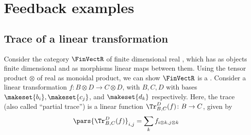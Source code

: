 
\section{Feedback examples}
\publictodomessage

\subsection{Trace of a linear transformation}
\label{subsec:trace-linear}
Consider the category $\FinVectR$ of finite dimensional real , which has as objects finite dimensional  and as morphisms linear maps between them.
Using the tensor product $\otimes$ of real  as monoidal product, we can show $\FinVectR$ is a .
Consider a linear transformation $f\colon B\otimes D\to C\otimes D$, with $B,C,D$  with bases $\makeset{b_i},\makeset{c_j}$, and $\makeset{d_k}$ respectively.
Here, the trace (also called ``partial trace'') is a linear function $\Tr_{B,C}
    ^D(f)\colon B\to C$, given by
\begin{equation}
    \pars{\Tr_{B,C}
        ^D(f) }_{i,j}=\sum_{k}f_{i\otimes k,j\otimes k}
\end{equation}


